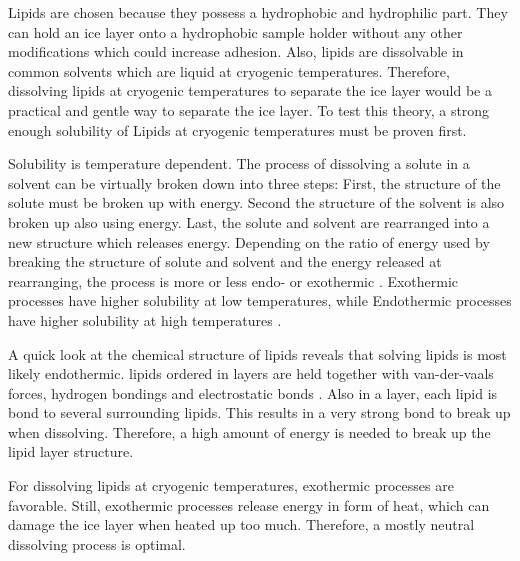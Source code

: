


Lipids are chosen because they possess a hydrophobic and hydrophilic part. They can hold an ice layer onto a hydrophobic sample holder without any other modifications which could increase adhesion. Also, lipids are dissolvable in common solvents which are liquid at cryogenic temperatures. Therefore, dissolving lipids at cryogenic temperatures to separate the ice layer would be a practical and gentle way to separate the ice layer. To test this theory, a strong enough solubility of Lipids at cryogenic temperatures must be proven first. 

Solubility is temperature dependent. The process of dissolving a solute in a solvent can be virtually broken down into three steps: First, the structure of the solute must be broken up with energy. Second the structure of the solvent is also broken up also using energy. Last, the solute and solvent are rearranged into a new structure which releases energy. Depending on the ratio of energy used by breaking the structure of solute and solvent and the energy released at rearranging, the process is more or less endo- or exothermic \cite{ZafirJaveed.}. Exothermic processes have higher solubility at low temperatures, while Endothermic processes have higher solubility at high temperatures \cite{Mortimer.2007}. 

A quick look at the chemical structure of lipids reveals that solving lipids is most likely endothermic. lipids ordered in layers are held together with van-der-vaals forces, hydrogen bondings and electrostatic bonds \cite{RWayneAlbers.1999}. Also in a layer, each lipid is bond to several surrounding lipids. This results in a very strong bond to break up when dissolving. Therefore, a high amount of energy is needed to break up the lipid layer structure. 

For dissolving lipids at cryogenic temperatures, exothermic processes are favorable. Still, exothermic processes release energy in form of heat, which can damage the ice layer when heated up too much. Therefore, a mostly neutral dissolving process is optimal. 

